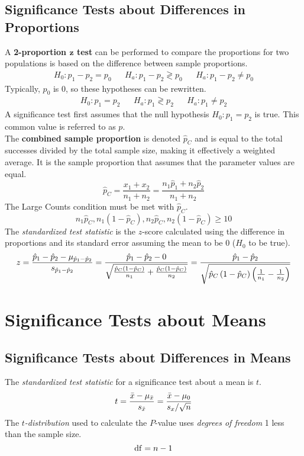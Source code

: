 \documentclass[../AP_Statistics.tex]{subfiles}
\begin{document}
			\subsection*{Significance Tests about Differences in Proportions}
				A \textbf{2-proportion $\pmb{z}$ test} can be performed to compare the proportions for two populations is based on the difference between sample proportions.
				\begin{align*}
					H_0:p_1 - p_2 = p_0 && H_a: p_1 - p_2 \gtrless p_0 && H_a:p_1 - p_2 \ne p_0
				\end{align*}
				Typically, $p_0$ is 0, so these hypotheses can be rewritten.
				\begin{align*}
					H_0:p_1 = p_2 && H_a:p_1 \gtrless p_2 && H_a:p_1 \ne p_2
				\end{align*}
				A significance test first assumes that the null hypothesis $H_0:p_1 = p_2$ is true. This common value is referred to as $p$. \\
				The \textbf{combined sample proportion} is denoted $\hat{p}_C$ and is equal to the total successes divided by the total sample size, making it effectively a weighted average. It is the sample proportion that assumes that the parameter values are equal.
				\[\hat{p}_C = \frac{x_1 + x_2}{n_1 + n_2} = \frac{n_1\hat{p}_1 + n_2\hat{p}_2}{n_1 + n_2}\]
				The Large Counts condition must be met with $\hat{p}_C$.
				\[n_1\hat{p}_C, n_1(1 - \hat{p}_C), n_2\hat{p}_C, n_2(1 - \hat{p}_C) \ge 10\]
				The \emph{standardized test statistic} is the $z$-score calculated using the difference in proportions and its standard error assuming the mean to be 0 ($H_0$ to be true).
				\[z = \frac{\hat{p}_1 - \hat{p}_2 - \mu_{\hat{p}_1 - \hat{p}_2}}{s_{\hat{p}_1 - \hat{p}_2}} = \frac{\hat{p}_1 - \hat{p}_2 - 0}{\sqrt{\frac{\hat{p}_C\left(1 - \hat{p}_C\right)}{n_1} + \frac{\hat{p}_C\left(1 - \hat{p}_C\right)}{n_2}}} = \frac{\hat{p}_1 - \hat{p}_2}{\sqrt{\hat{p}_C\left(1 - \hat{p}_C\right)\left(\frac{1}{n_1} - \frac{1}{n_2}\right)}}\]
		\section{Significance Tests about Means}
			\subsection*{Significance Tests about Differences in Means}
			The \emph{standardized test statistic} for a significance test about a mean is $t$.
			\[t = \frac{\bar{x} - \mu_{\bar{x}}}{s_{\bar{x}}} = \frac{\bar{x} - \mu_0}{s_x/\sqrt{n}}\]
			The \emph{$t$-distribution} used to calculate the $P$-value uses \emph{degrees of freedom} 1 less than the sample size.
			\[\operatorname{\mathrm{df}} = n - 1\]
			
\end{document}
